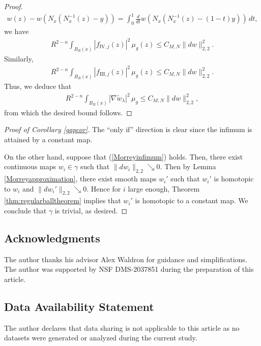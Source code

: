 \documentclass[12pt]{amsart}
\renewcommand{\1}{{\mathbf 1}}
\theoremstyle{others}
\numberwithin{equation}{section}
\begin{document}
\begin{proof}
\begin{align*}
        w(z) - w\left(N_x\left(N_x^{-1}(z)-y\right)\right) = \int_0^1 \frac{d}{dt} w\left(N_x\left(N_x^{-1}(z) - (1-t)y\right)\right) \, dt,
    \end{align*} we have 
    \begin{align*}
        R^{2-n}\int_{B_R(x)} |f_{\text{IV}, j}(z)|^2 \, \mu_g(z) \leq C_{M, N} \|dw\|_{2, 2}^2.
    \end{align*} Similarly,
    \begin{align*}
        R^{2-n}\int_{B_R(x)} |f_{\text{III}, j}(z)|^2 \, \mu_g(z) \leq C_{M, N} \|dw\|_{2, 2}^2.
    \end{align*}
    Thus, we deduce that
    \begin{align*}
        R^{2-n} \int_{B_R(x)} |\nabla \tilde{w}_\lambda|^2 \, \mu_g \leq C_{M, N} \|d w\|_{2, 2}^2,
    \end{align*} from which the desired bound follows.
\end{proof}
\begin{proof}[Proof of Corollary \ref{gapcor}]
  

    The ``only if'' direction is clear since the infimum is attained by a constant map.
    
    On the other hand, suppose that (\ref{Morreyinfimum}) holds. Then, there exist continuous maps \(w_i \in \gamma\) such that \(\|dw_i\|_{2, 2} \searrow 0\). Then by Lemma \ref{Morreyapproximation}, there exist smooth maps \(w_i'\) such that \(w_i'\) is homotopic to \(w_i\) and \(\|dw_i'\|_{2, 2} \searrow 0\). Hence for \(i\) large enough, Theorem \ref{thm:regularballtheorem} implies that \(w_i'\) is homotopic to a constant map. We conclude that \(\gamma\) is trivial, as desired.
\end{proof}

\subsection*{Acknowledgments}
The author thanks his advisor Alex Waldron for guidance and simplifications. The author was supported by NSF DMS-2037851 during the preparation of this article.
\subsection*{Data Availability Statement}
The author declares that data sharing is not applicable to this article as no datasets were generated or analyzed during the current study.
\end{document}
